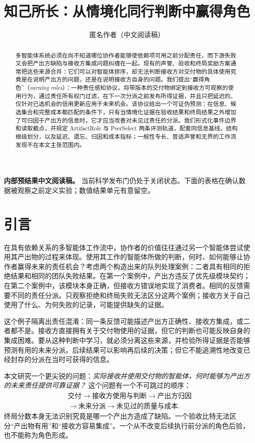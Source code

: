 \documentclass[UTF8,twocolumn]{ctexart}
\title{知己所长：从情境化同行判断中赢得角色}
\author{匿名作者（中文阅读稿）}
\date{}
\begin{document}
\maketitle
\noindent\textbf{内部预结果中文阅读稿。} 当前科学发布门仍处于关闭状态。下面的表格在确认数据被观察之前定义实验；数值结果单元有意留空。

\begin{abstract}
多智能体系统必须在尚不知道哪位协作者能够使依赖项可用之前分配责任，而下游失败又会把产出方缺陷与接收方集成问题纠缠在一起。现有的声誉、验收和终局奖励方案通常把这些来源合并：它们可以对智能体排序，却无法判断接收方对交付物的具体使用究竟是在说明产出方的问题，还是在说明接收方自身的问题。我们提出“赢得角色”（\emph{earning roles}）：一种责任感知协议，将带版本的交付物绑定到接收方可观察的使用行为，通过责任所有权门过滤，在下一次分派之前发布所得证据，并且只把延迟的、仅针对已选机会的信用更新应用于未来机会。该协议给出一个可证伪预测：在信息、候选集合和完整成本都匹配的条件下，只有当情境化证据在验收结果和终局结果之外增加了可归因于产出方的信息时，它才应当改善对未见过责任的分派。我们形式化事件边界和读取截点，并规定 ArtifactRole 与 PeerSelect 两条评测轨道，配套同信息基线、结构根级划分，以及延迟、遗忘、归因和成本指标；一般性专长、普适声誉和无界的工作流发现不在本文主张范围内。
\end{abstract}

\section{引言}

在具有依赖关系的多智能体工作流中，协作者的价值往往通过另一个智能体尝试使用其产出物的过程来体现。使用其工作的智能体所做的判断，何时、如何能够让协作者赢得未来的责任机会？考虑两个构造出来的队列处理案例：二者具有相同的拒绝结果和相同的团队失败结果。在第一个案例中，产出方违反了优先级模块契约；在第二个案例中，该模块本身正确，但接收方错误地实现了消费者。相同的反馈需要不同的责任分派。只观察拒绝和终局失败无法区分这两个案例；接收方关于自己使用了什么、为何失败的记录，可能提供缺失的证据。

这个例子隔离出责任混淆：同一条反馈可能描述产出方正确性、接收方集成，或二者都不是。接收方直接拥有关于交付物使用的证据，但它的判断也可能反映自身的集成困难。要从这种判断中学习，就必须分离这些来源，并检验所得证据是否能够预测有用的未来分派。后续结果可以影响再后续的决策；但它不能追溯性地改变已经封存的分派在当时可获得的信息。

本文研究一个更尖锐的问题：\emph{实际接收并使用交付物的智能体，何时能够为产出方的未来责任提供可靠证据？} 这个问题有一个不可跳过的顺序：
\begin{equation}
\begin{aligned}
&\text{交付}\rightarrow\text{接收方使用与判断}\rightarrow\text{产出方归因}\\
&\rightarrow\text{未来分派}\rightarrow\text{未见过的质量与成本}.
\end{aligned}
\label{eq:story}
\end{equation}
终局分数本身无法识别究竟是哪一个产出方造成了缺陷。一个验收比特无法区分“产出物有用”和“接收方容易集成”。一个从不改变后续执行前分派的角色后验，也不能称为角色形成。
\end{document}
